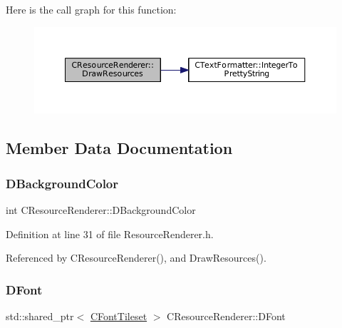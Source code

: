 Here is the call graph for this function\+:\nopagebreak
\begin{figure}[H]
\begin{center}
\leavevmode
\includegraphics[width=350pt]{classCResourceRenderer_ad10676ab10fe217aebbc3dca68d745b0_cgraph}
\end{center}
\end{figure}


\subsection{Member Data Documentation}
\hypertarget{classCResourceRenderer_a7985a8b9266542c506acc20b12e23ebb}{}\label{classCResourceRenderer_a7985a8b9266542c506acc20b12e23ebb} 
\subsubsection{\texorpdfstring{D\+Background\+Color}{DBackgroundColor}}
{\footnotesize\ttfamily int C\+Resource\+Renderer\+::\+D\+Background\+Color\hspace{0.3cm}{\ttfamily [protected]}}



Definition at line 31 of file Resource\+Renderer.\+h.



Referenced by C\+Resource\+Renderer(), and Draw\+Resources().

\hypertarget{classCResourceRenderer_acd1383d226622757afdcdcf6d9747aa0}{}\label{classCResourceRenderer_acd1383d226622757afdcdcf6d9747aa0} 
\subsubsection{\texorpdfstring{D\+Font}{DFont}}
{\footnotesize\ttfamily std\+::shared\+\_\+ptr$<$ \hyperlink{classCFontTileset}{C\+Font\+Tileset} $>$ C\+Resource\+Renderer\+::\+D\+Font\hspace{0.3cm}{\ttfamily [protected]}}




